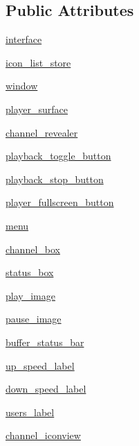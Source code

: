 \subsection*{Public Attributes}
\begin{DoxyCompactItemize}
\item 
\hyperlink{classsrc_1_1view_1_1main__window_1_1Main__Window_af24c3030c5e5245a11447c8d8509ab84}{interface}
\item 
\hyperlink{classsrc_1_1view_1_1main__window_1_1Main__Window_a418350e5cf0666b6c971596b4a130b27}{icon\+\_\+list\+\_\+store}
\item 
\hyperlink{classsrc_1_1view_1_1main__window_1_1Main__Window_a8644cd8403ec3e07c40c175ac02d12f8}{window}
\item 
\hyperlink{classsrc_1_1view_1_1main__window_1_1Main__Window_a233a2cfa3ea644676107a2bc255ed5ab}{player\+\_\+surface}
\item 
\hyperlink{classsrc_1_1view_1_1main__window_1_1Main__Window_ad789bc369e236f80e9dfad072315655e}{channel\+\_\+revealer}
\item 
\hyperlink{classsrc_1_1view_1_1main__window_1_1Main__Window_a1df5a151eec7af31e540084b63f4f107}{playback\+\_\+toggle\+\_\+button}
\item 
\hyperlink{classsrc_1_1view_1_1main__window_1_1Main__Window_a45cf930858523178d511df7b7d12bd08}{playback\+\_\+stop\+\_\+button}
\item 
\hyperlink{classsrc_1_1view_1_1main__window_1_1Main__Window_aad34b1ddb523a0b52585d8e214ffcf41}{player\+\_\+fullscreen\+\_\+button}
\item 
\hyperlink{classsrc_1_1view_1_1main__window_1_1Main__Window_a68833577cf3b6d909a7f3c131c669414}{menu}
\item 
\hyperlink{classsrc_1_1view_1_1main__window_1_1Main__Window_ac675f0f323c64cf0c5e9ae9da1582820}{channel\+\_\+box}
\item 
\hyperlink{classsrc_1_1view_1_1main__window_1_1Main__Window_aefce252afd2226a6ae5800b5048b138e}{status\+\_\+box}
\item 
\hyperlink{classsrc_1_1view_1_1main__window_1_1Main__Window_a1aeea66a67e1111c19465f757f98d646}{play\+\_\+image}
\item 
\hyperlink{classsrc_1_1view_1_1main__window_1_1Main__Window_a4ee8e4579c73d50ccde28ed862d5b6c0}{pause\+\_\+image}
\item 
\hyperlink{classsrc_1_1view_1_1main__window_1_1Main__Window_abfb08165a5d96312736e12ca5fb45858}{buffer\+\_\+status\+\_\+bar}
\item 
\hyperlink{classsrc_1_1view_1_1main__window_1_1Main__Window_a979c127a0d3d8e268e34d1f42d08f9e4}{up\+\_\+speed\+\_\+label}
\item 
\hyperlink{classsrc_1_1view_1_1main__window_1_1Main__Window_aaaa9c99efa7d378fba59e5d84345224f}{down\+\_\+speed\+\_\+label}
\item 
\hyperlink{classsrc_1_1view_1_1main__window_1_1Main__Window_a6cdc98b9d18f4ebad3dc497900a9be70}{users\+\_\+label}
\item 
\hyperlink{classsrc_1_1view_1_1main__window_1_1Main__Window_aee3348cefb972be414d15d78a466f5ee}{channel\+\_\+iconview}
\end{DoxyCompactItemize}
